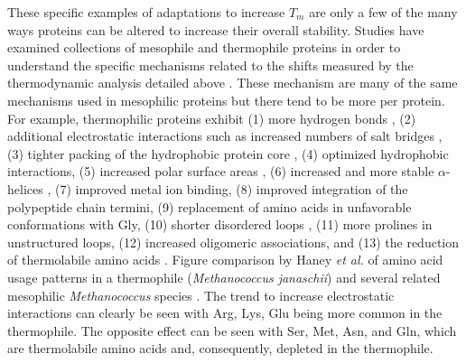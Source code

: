 {These specific examples of adaptations to increase ${T}_{m}$ are only a few of
the many ways proteins can be altered to increase their overall stability.
Studies have examined collections of mesophile and thermophile proteins in
order to understand the specific mechanisms related to the shifts measured by
the thermodynamic analysis detailed above \cite{jaenicke1998spe}.  These
mechanism are many of the same mechanisms used in mesophilic proteins but there
tend to be more per protein.  For example, thermophilic proteins exhibit (1)
more hydrogen bonds \cite{PMID_11577980}, (2) additional electrostatic
interactions such as increased numbers of salt bridges \cite{beeby_31,PMID_10097079},
(3) tighter packing of the hydrophobic protein core \cite{beeby_29}, (4)
optimized hydrophobic interactions, (5) increased polar surface areas
\cite{PMID_10940293}, (6) increased and more stable $\alpha$-helices
\cite{PMID_11577980}, (7) improved metal ion binding, (8) improved integration
of the polypeptide chain termini, (9) replacement of amino acids in unfavorable
conformations with Gly, (10) shorter disordered loops \cite{thompson1999tel},
(11) more prolines in unstructured loops, (12) increased oligomeric
associations, and (13) the reduction of thermolabile amino acids
\cite{PMID_11577980,PMID_10097079}. Figure %
comparison by Haney \emph{et al.} of amino acid usage patterns in a thermophile
(\emph{Methanococcus janaschii}) and several related mesophilic
\emph{Methanococcus} species \cite{PMID_10097079}.  The trend to increase electrostatic interactions
can clearly be seen with Arg, Lys, Glu being more common in the thermophile.
The opposite effect can be seen with Ser, Met, Asn, and Gln, which are
thermolabile amino acids and, consequently, depleted in the thermophile.



}

